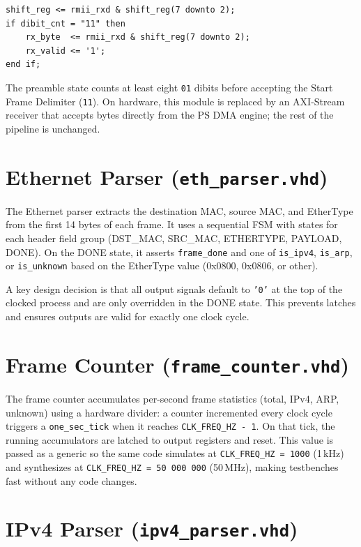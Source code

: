 \documentclass[12pt, a4paper]{report}
\begin{document}
\begin{lstlisting}[caption={Dibit assembly in \texttt{rmii\_rx.vhd}}, label=lst:rmii]
shift_reg <= rmii_rxd & shift_reg(7 downto 2);
if dibit_cnt = "11" then
    rx_byte  <= rmii_rxd & shift_reg(7 downto 2);
    rx_valid <= '1';
end if;
\end{lstlisting}

The preamble state counts at least eight \texttt{01} dibits before accepting the Start Frame Delimiter (\texttt{11}). On hardware, this module is replaced by an AXI-Stream receiver that accepts bytes directly from the PS DMA engine; the rest of the pipeline is unchanged.

\section{Ethernet Parser (\texttt{eth\_parser.vhd})}

The Ethernet parser extracts the destination MAC, source MAC, and EtherType from the first 14 bytes of each frame. It uses a sequential FSM with states for each header field group (DST\_MAC, SRC\_MAC, ETHERTYPE, PAYLOAD, DONE). On the DONE state, it asserts \texttt{frame\_done} and one of \texttt{is\_ipv4}, \texttt{is\_arp}, or \texttt{is\_unknown} based on the EtherType value (0x0800, 0x0806, or other).

A key design decision is that all output signals default to \texttt{'0'} at the top of the clocked process and are only overridden in the DONE state. This prevents latches and ensures outputs are valid for exactly one clock cycle.

\section{Frame Counter (\texttt{frame\_counter.vhd})}

The frame counter accumulates per-second frame statistics (total, IPv4, ARP, unknown) using a hardware divider: a counter incremented every clock cycle triggers a \texttt{one\_sec\_tick} when it reaches \texttt{CLK\_FREQ\_HZ - 1}. On that tick, the running accumulators are latched to output registers and reset. This value is passed as a generic so the same code simulates at \texttt{CLK\_FREQ\_HZ = 1000} (1\,kHz) and synthesizes at \texttt{CLK\_FREQ\_HZ = 50\,000\,000} (50\,MHz), making testbenches fast without any code changes.

\section{IPv4 Parser (\texttt{ipv4\_parser.vhd})}
\end{document}
